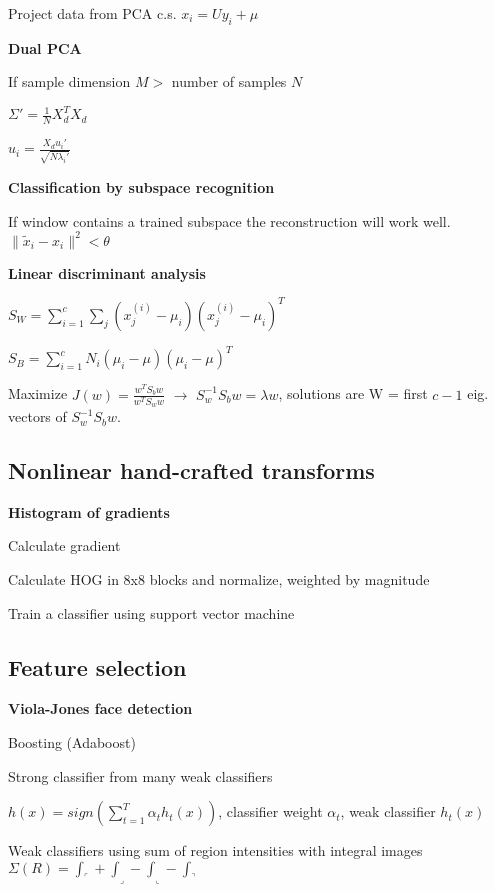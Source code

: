 \documentclass{article}
\begin{document}
\begin{multicols*}{2}
{Project data from PCA c.s. $x_i = U y_i + \mu$

\textbf{Dual PCA}

If sample dimension $M >$  number of samples $N$

$\Sigma' = \frac{1}{N}X_d^TX_d$

$u_i = \frac{X_d u_i'}{\sqrt{N \lambda_i'}}$

\textbf{Classification by subspace recognition}

If window contains a trained subspace the reconstruction will work well. $\|\tilde{x}_i-x_i\|^2 < \theta$

\textbf{Linear discriminant analysis}

$S_W = \sum_{i=1}^{c}\sum_{j}(x_j^{(i)} - \mu_i)(x_j^{(i)} - \mu_i)^T$

$S_B = \sum_{i=1}^{c}N_i(\mu_i - \mu)(\mu_i - \mu)^T$

Maximize $J(w) = \frac{w^TS_bw}{w^TS_ww}$ $\rightarrow$ $S_w^{-1}S_bw=\lambda w$, solutions are W = first $c - 1$ eig. vectors of $S_w^{-1}S_bw$.

\subsection{Nonlinear hand-crafted transforms}

\textbf{Histogram of gradients}

\begin{compactenum}
	\item Calculate gradient
	\item Calculate HOG in 8x8 blocks and normalize, weighted by magnitude
	\item Train a classifier using support vector machine
\end{compactenum}

\subsection{Feature selection}

\textbf{Viola-Jones face detection}

Boosting (Adaboost)
\begin{compactitem}
	\item Strong classifier from many weak classifiers
	
	$h(x) = sign(\sum_{t=1}^{T} \alpha_t h_t(x) )$, classifier weight $\alpha_t$, weak classifier $h_t(x)$
	
	\item Weak classifiers using sum of region intensities with integral images $\Sigma (R) = \int_\ulcorner + \int_\lrcorner - \int_\llcorner - \int_\urcorner$
	

\end{compactitem}}
\end{multicols*}
\end{document}
